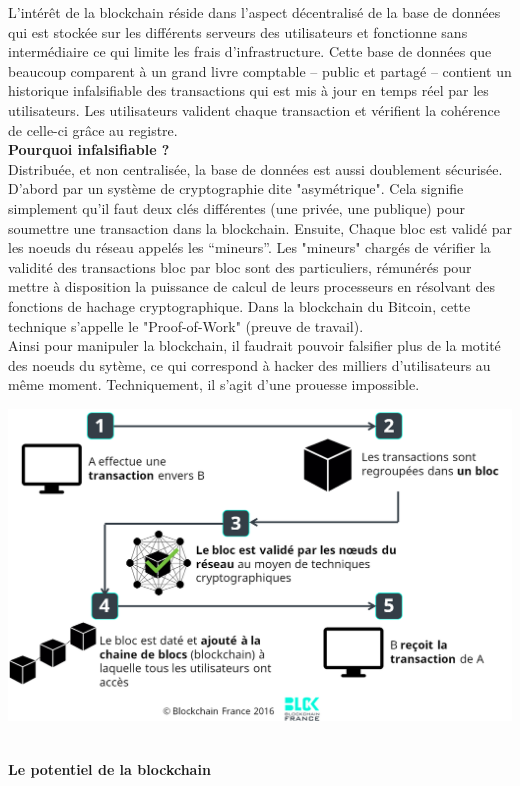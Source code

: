 \documentclass{article}
\begin{document}
L’intérêt de la blockchain réside dans l’aspect décentralisé de la base de données qui est stockée sur les différents serveurs des utilisateurs et fonctionne sans intermédiaire ce qui limite les frais d’infrastructure. Cette base de données que beaucoup comparent à un grand livre comptable – public et partagé – contient un historique infalsifiable des transactions qui est mis à jour en temps réel par les utilisateurs. Les utilisateurs valident chaque transaction et vérifient la cohérence de celle-ci grâce au registre. \\

\textbf{Pourquoi infalsifiable ? } \\
Distribuée, et non centralisée, la base de données est aussi doublement sécurisée. D'abord par un système de cryptographie dite "asymétrique". Cela signifie simplement qu'il faut deux clés différentes (une privée, une publique) pour soumettre une transaction dans la blockchain. Ensuite, Chaque bloc est validé par les noeuds du réseau appelés les “mineurs”. Les "mineurs" chargés de vérifier la validité des transactions bloc par bloc sont des particuliers, rémunérés pour mettre à disposition la puissance de calcul de leurs processeurs en résolvant des fonctions de hachage cryptographique. Dans la blockchain du Bitcoin, cette technique s'appelle le "Proof-of-Work" (preuve de travail). \cite{7x7} \\
Ainsi pour manipuler la blockchain, il faudrait pouvoir falsifier plus de la motité des noeuds du sytème, ce qui correspond à hacker des milliers d'utilisateurs au même moment. Techniquement, il s’agit d’une prouesse impossible. \\
\begin{center}
\includegraphics[scale=0.4]{blck-fonctionnement.png}
\end{center}
\\
\textbf{Le potentiel de la blockchain} \cite{bcfr}\\
\end{document}
